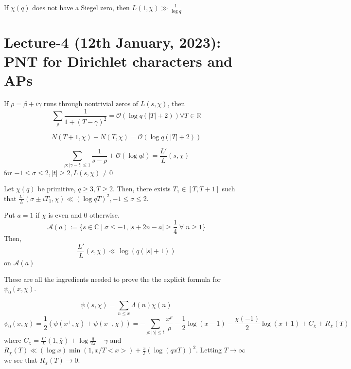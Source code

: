 \documentclass[oneside, 12pt, ]{scrbook}
\newcommand{\CC}{\mathbb C}
\newcommand{\RR}{\mathbb R}
\theoremstyle{theorem}
\begin{document}
\begin{theorem}
If $\chi(q)$ does not have a Siegel zero, then $L(1, \chi) \gg \frac{1}{\log q}$
\end{theorem}


\chapter{Lecture-4 (12th January, 2023): PNT for Dirichlet characters and APs}

\begin{lemma}
If $\rho = \beta + i \gamma$ runs through nontrivial zeros of $L(s, \chi)$, then $$\sum_{\rho} \frac{1}{1 + (T - \gamma)^2} = \mathcal{O} (\log q(|T| + 2)) \forall T \in \RR $$
\end{lemma}

\begin{lemma}
$$N(T+1, \chi) - N(T , \chi) = \mathcal{O} (\log q (|T| + 2))$$
\end{lemma}

\begin{lemma}
$$\sum_{\rho: |\gamma - t|\le 1} \frac{1}{s - \rho} + \mathcal{O}(\log qt) = \frac{L'}{L}(s,\chi)$$ for $-1 \le \sigma \le 2 , |t|\geq 2, L(s,\chi) \neq 0$
\end{lemma}

\begin{lemma}
Let $\chi(q)$ be primitive, $q \geq 3, T \geq 2$. Then, there exists $T_{1} \in [T,T+1]$ such that $\frac{L'}{L}(\sigma \pm iT_{1}, \chi) \ll (\log qT)^2 , -1 \le \sigma \le 2$.
\end{lemma}

\begin{lemma}
Put $a=1$ if $\chi$ is even and $0$ otherwise. $$\mathcal{A}(a) := \{ s \in \CC \mid \sigma \le -1 , |s + 2n - a| \geq \frac{1}{4} \; \forall \; n \geq 1\}$$ Then, $$\frac{L'}{L} (s, \chi) \ll \log (q(|s|+1))$$ on $\mathcal{A}(a)$
\end{lemma}

These are all the ingredients needed to prove the the explicit formula for $\psi_{0}(x, \chi)$. 

\begin{theorem}
$$\psi(s,\chi) = \sum_{n \le x} \Lambda(n) \chi(n)$$ $$\psi_{0}(x,\chi)  = \frac{1}{2}(\psi(x^{+}, \chi) + \psi(x^{-}, \chi)) = - \sum_{\rho : |\gamma|\le t} \frac{x^{\rho}}{\rho} - \frac{1}{2} \log (x-1) - \frac{\chi(-1)}{2} \log (x+1) + C_{\chi} + R_{\chi}(T)$$ where $C_{\chi} = \frac{L'}{L} (1, \overline{\chi}) + \log \frac{q}{2 \pi} - \gamma$ and $R_{\chi}(T) \ll (\log x)\min(1, x/T <x>) + \frac{x}{T} (\log (qxT))^2$. Letting $T \rightarrow \infty$ we see that $R_{\chi}(T) \rightarrow 0$.
\end{theorem}
\end{document}
